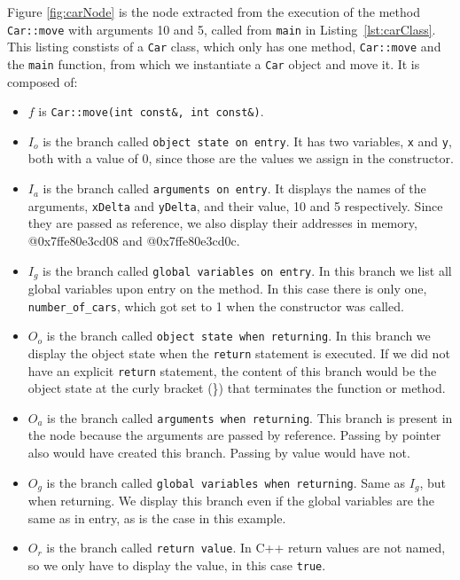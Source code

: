 \begin{definition}[Node]
\begin{exmp}
Figure \ref{fig:carNode} is the node extracted from the execution of the method \verb|Car::move| with arguments 10 and 5, called from \verb|main| in Listing~\ref{lst:carClass}. This listing constists of a \verb|Car| class, which only has one method, \verb|Car::move| and the \verb|main| function, from which we instantiate a \verb|Car| object and move it. It is composed of:
\begin{itemize}
    \item \(f\) is \verb|Car::move(int const&, int const&)|.
    \item \(I_o\) is the branch called \verb|object state on entry|. It has two variables, \verb|x| and \verb|y|, both with a value of 0, since those are the values we assign in the constructor.
    \item \(I_a\) is the branch called \verb|arguments on entry|. It displays the names of the arguments, \verb|xDelta| and \verb|yDelta|, and their value, 10 and 5 respectively. Since they are passed as reference, we also display their addresses in memory, @0x7ffe80e3cd08 and @0x7ffe80e3cd0c.
    \item \(I_g\) is the branch called \verb|global variables on entry|. In this branch we list all global variables upon entry on the method. In this case there is only one, \verb|number_of_cars|, which got set to 1 when the constructor was called.
    \item \(O_o\) is the branch called \verb|object state when returning|. In this branch we display the object state when the \verb|return| statement is executed. If we did not have an explicit \verb|return| statement, the content of this branch would be the object state at the curly bracket (\}) that terminates the function or method. 
    \item \(O_a\) is the branch called \verb|arguments when returning|. This branch is present in the node because the arguments are passed by reference. Passing by pointer also would have created this branch. Passing by value would have not.
    \item \(O_g\) is the branch called \verb|global variables when returning|. Same as \(I_g\), but when returning. We display this branch even if the global variables are the same as in entry, as is the case in this example.
    \item \(O_r\) is the branch called \verb|return value|. In C++ return values are not named, so we only have to display the value, in this case \verb|true|. 
\end{itemize}


\end{exmp}
\end{definition}
